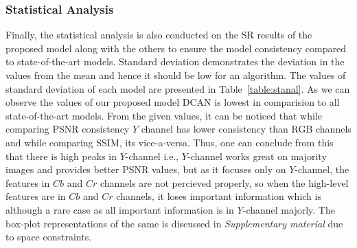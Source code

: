 \documentclass[conference]{IEEEtran}
\newcommand{\kr}[1]{\textcolor{red}{Kiran - #1}}
\newcommand{\as}[1]{\textcolor{cyan}{Anjali - #1}}
\begin{document}
\subsubsection*{Statistical Analysis}
Finally, the statistical analysis is also conducted on the SR results of the proposed model along with the others to ensure the model consistency compared to state-of-the-art models. Standard deviation demonstrates the deviation in the values from the mean and hence it should be low for an algorithm. The values of standard deviation of each model are presented in Table~\ref{table:stanal}. As we can observe the values of our proposed model DCAN is lowest in comparision to all state-of-the-art models. From the given values, it can be noticed that while comparing PSNR consistency $Y$ channel has lower consistency than RGB channels and while comparing SSIM, its vice-a-versa. Thus, one can conclude from this that there is high peaks in $Y$-channel i.e., $Y$-channel works great on majority images and provides better PSNR values, but as it focuses only on $Y$-channel, the features in $Cb$ and $Cr$ channels are not percieved properly, so when the high-level features are in $Cb$ and $Cr$ channels, it loses important information which is although a rare case as all important information is in $Y$-channel majorly. The box-plot representations of the same is discussed in \emph{Supplementary material} due to space constraints. 
\end{document}
